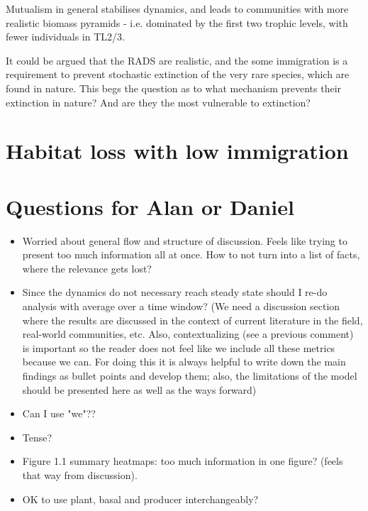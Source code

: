 \begin{itemize}


Mutualism in general stabilises dynamics, and leads to communities with more realistic biomass pyramids - i.e. dominated by the first two trophic levels, with fewer individuals in TL2/3. 

It could be argued that the RADS are realistic, and the some immigration is a requirement to prevent stochastic extinction of the very rare species, which are found in nature. This begs the question as to what mechanism prevents their extinction in nature? And are they the most vulnerable to extinction?  

\section{Habitat loss with low immigration}

\section{Questions for Alan or Daniel}

\begin{itemize}
	\item Worried about general flow and structure of discussion. Feels like trying to present too much information all at once. How to not turn into a list of facts, where the relevance gets lost?

	\item Since the dynamics do not necessary reach steady state should I re-do analysis with average over a time window? (We need a discussion section where the results are discussed in the context of current literature in the field, real-world communities, etc. Also, contextualizing (see a previous comment) is important so the reader does not feel like we include all these metrics because we can. For doing this it is always helpful to write down the main findings as bullet points and develop them; also, the limitations of the model should be presented here as well as the ways forward)
	\item Can I use "we"??
	\item Tense?
	\item Figure 1.1 summary heatmaps: too much information in one figure? (feels that way from discussion).
	\item OK to use plant, basal and producer interchangeably?


\end{itemize}
\end{itemize}
